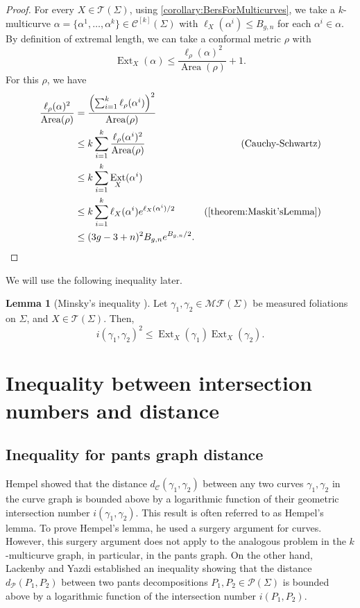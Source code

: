 \documentclass[a4paper,11pt]{amsart}
\numberwithin{equation}{section}
\theoremstyle{definition}
\newtheorem{lemma}[theorem]{Lemma}
\newcommand{\Teich}{\mathcal{T}}
\DeclareMathOperator{\Ext}{Ext}
\DeclareMathOperator{\Area}{Area}
\newcommand{\multicurve}[1]{\mathcal{C}^{[#1]}}
\begin{document}
\begin{proof}
    For every $X\in\Teich(\Sigma)$, using \cref{corollary:BersForMulticurves}, we take a $k$-multicurve $\alpha=\{\alpha^1,\ldots,\alpha^k\} \in \multicurve{k}(\Sigma)$ with $\ell_X(\alpha^i)\leq B_{g,n}$ for each $\alpha^i\in\alpha$.
    By definition of extremal length, we can take a conformal metric $\rho$ with 
    \begin{equation*}
        \Ext_X(\alpha)\leq \frac{\ell_\rho(\alpha)^2}{\Area(\rho)}+1.
    \end{equation*}
    For this $\rho$, we have 
    \begin{align*}
        \frac{\ell_\rho(\alpha)^2}{\Area(\rho)}&=\frac{\left(\sum_{i=1}^k\ell_\rho(\alpha^i)\right)^2}{\Area(\rho)} & \\
        &\leq k \sum_{i=1}^k\frac{\ell_\rho(\alpha^i)^2}{\Area(\rho)} & (\text{Cauchy-Schwartz})\\
        &\leq k\sum_{i=1}^k \Ext_X(\alpha^i) \\
        &\leq k \sum_{i=1}^k \ell_X(\alpha^i)e^{\ell_X(\alpha^i)/2} & (\text{\Cref{theorem:Maskit'sLemma}})\\
        &\leq (3g-3+n)^2B_{g,n}e^{B_{g,n}/2}.
    \end{align*}
\end{proof}

We will use the following inequality later.

\begin{lemma}[Minsky's inequality \cite{minsky1993ends}]\label{lemma:MinskyInequality}
    Let $\gamma_1,\gamma_2\in\mathcal{MF}(\Sigma)$ be measured foliations on $\Sigma$, and $X\in \Teich(\Sigma)$. Then,
    \begin{equation*}
        i(\gamma_1,\gamma_2)^2\leq \Ext_X(\gamma_1)\Ext_X(\gamma_2).
    \end{equation*}
\end{lemma}

\section{Inequality between intersection numbers and distance}

\subsection{Inequality for pants graph distance}

Hempel \cite{hempel2001three-manifolds} showed that the distance $d_{\mathcal{C}}(\gamma_1,\gamma_2)$ between any two curves $\gamma_1,\gamma_2$ in the curve graph is bounded above by a logarithmic function of their geometric intersection number $i(\gamma_1,\gamma_2)$.
This result is often referred to as Hempel's lemma.
To prove Hempel's lemma, he used a surgery argument for curves.
However, this surgery argument does not apply to the analogous problem in the $k$-multicurve graph, in particular, in the pants graph.
On the other hand, Lackenby and Yazdi \cite{lackenby2024bounds} established an inequality showing that the distance $d_{\mathcal{P}}(P_1,P_2)$ between two pants decompositions $P_1,P_2 \in \mathcal{P}(\Sigma)$ is bounded above by a logarithmic function of the intersection number $i(P_1,P_2)$.
\end{document}
